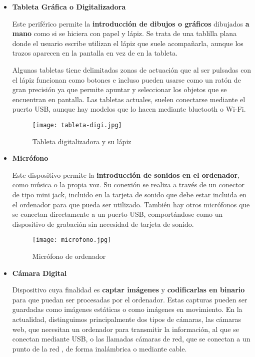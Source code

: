 \begin{itemize}
    \item \textbf{Tableta Gráfica o Digitalizadora}

    Este periférico permite la \textbf{introducción de dibujos o gráficos} dibujados \textbf{a mano} como si se hiciera con papel y lápiz. Se trata de una tablilla plana donde el usuario escribe utilizan el lápiz que suele acompañarla, aunque los trazos aparecen en la pantalla en vez de en la tableta.

    Algunas tabletas tiene delimitadas zonas de actuación que al ser pulsadas con el lápiz funcionan como botones e incluso pueden usarse como un ratón de gran precisión ya que permite apuntar y seleccionar los objetos que se encuentran en pantalla. Las tabletas actuales, suelen conectarse mediante el puerto USB, aunque hay modelos que lo hacen mediante bluetooth o Wi-Fi.

     \vspace{4ex}

    \begin{figure}[ht]
        \centering
        \texttt{[image: tableta-digi.jpg]}
        \caption{Tableta digitalizadora y su lápiz}
    \end{figure}

    \item  \textbf{Micrófono}

    Este dispositivo permite la \textbf{introducción de sonidos en el ordenador}, como música o la propia voz. Su conexión se realiza a través de un conector de tipo mini jack, incluido en la tarjeta de sonido que debe estar incluida en el ordenador para que pueda ser utilizado. También hay otros micrófonos que se conectan directamente a un puerto USB, comportándose como un dispositivo de grabación sin necesidad de tarjeta de sonido.

    \vspace{4ex}

    \begin{figure}[ht]
        \centering
        \texttt{[image: microfono.jpg]}
        \caption{Micrófono de ordenador}
    \end{figure}

    \item \textbf{Cámara Digital}

    Dispositivo cuya finalidad es \textbf{captar imágenes} y \textbf{codificarlas en binario} para que puedan ser procesadas por el ordenador. Estas capturas pueden ser guardadas como imágenes estáticas o como imágenes en movimiento. En la actualidad, distinguimos principalmente dos tipos de cámaras, las cámaras web, que necesitan un ordenador para transmitir la información, al que se conectan mediante USB, o las llamadas cámaras de red, que se conectan a un punto de la red , de forma inalámbrica o mediante cable.


\end{itemize}
